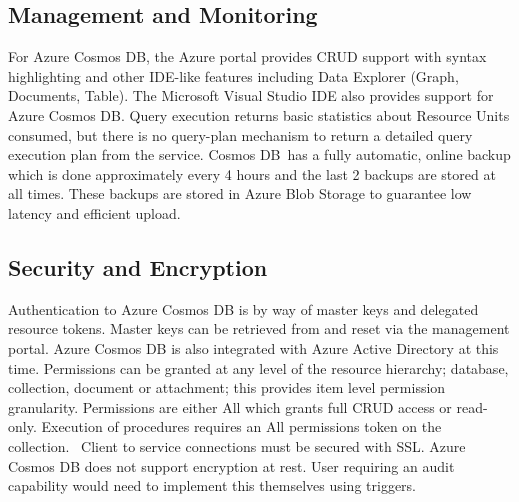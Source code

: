 \subsection{Management and Monitoring}
For Azure Cosmos DB, the Azure portal provides CRUD support with syntax highlighting and other IDE-like features including Data Explorer (Graph, Documents, Table). The Microsoft Visual Studio IDE also provides support for Azure Cosmos DB.
Query execution returns basic statistics about Resource Units consumed, but there is no query-plan mechanism to return a detailed query execution plan from the service.
Cosmos DB has a fully automatic, online backup which is done approximately every 4 hours and the last 2 backups are stored at all times. These backups are stored in Azure Blob Storage to guarantee low latency and efficient upload.


\subsection{Security and Encryption}
Authentication to Azure Cosmos DB is by way of master keys and delegated resource tokens. Master keys can be retrieved from and reset via the management portal. Azure Cosmos DB is also integrated with Azure Active Directory at this time. 
Permissions can be granted at any level of the resource hierarchy; database, collection, document or attachment; this provides item level permission granularity. Permissions are either All which grants full CRUD access or read-only. Execution of procedures requires an All permissions token on the collection. 
Client to service connections must be secured with SSL. Azure Cosmos DB does not support encryption at rest. User requiring an audit capability would need to implement this themselves using triggers.

